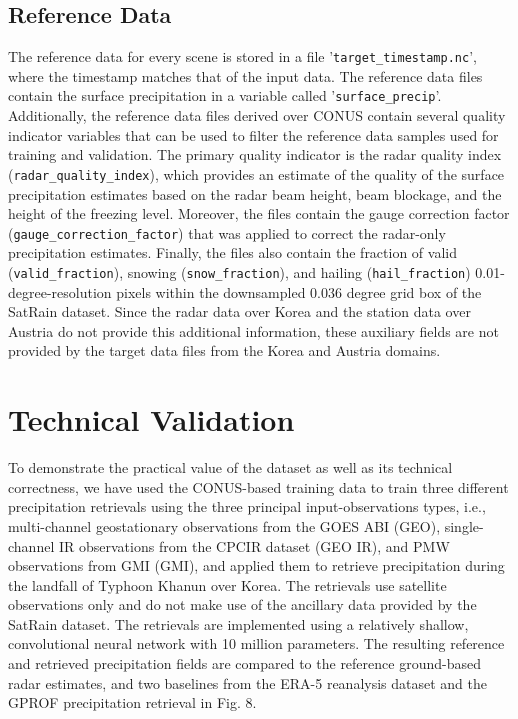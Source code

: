 \documentclass[11pt]{article}
\begin{document}
\subsection{Reference Data}

The reference data for every scene is stored in a file
'\texttt{target\_\textlangle timestamp\textrangle.nc}', where the timestamp
matches that of the input data. The reference data files contain the surface
precipitation in a variable called '\texttt{surface\_precip}'. Additionally, the
reference data files derived over CONUS contain several quality indicator
variables that can be used to filter the reference data samples used for
training and validation. The primary quality indicator is the radar quality
index (\texttt{radar\_quality\_index}), which provides an estimate of the
quality of the surface precipitation estimates based on the radar beam height,
beam blockage, and the height of the freezing level. Moreover, the files contain
the gauge correction factor (\texttt{gauge\_correction\_factor}) that was
applied to correct the radar-only precipitation estimates. Finally, the files
also contain the fraction of valid (\texttt{valid\_fraction}), snowing
(\texttt{snow\_fraction}), and hailing (\texttt{hail\_fraction})
0.01-degree-resolution pixels within the downsampled 0.036 degree grid box of
the SatRain dataset. Since the radar data over Korea and the station data over
Austria do not provide this additional information, these auxiliary fields are
not provided by the target data files from the Korea and Austria domains.


\section{Technical Validation}

To demonstrate the practical value of the dataset as well as its technical
correctness, we have used the CONUS-based training data to train three different
precipitation retrievals using the three principal input-observations types,
i.e., multi-channel geostationary observations from the GOES ABI (GEO),
single-channel IR observations from the CPCIR dataset (GEO IR), and PMW
observations from GMI (GMI), and applied them to retrieve precipitation during
the landfall of Typhoon Khanun over Korea. The retrievals use satellite
observations only and do not make use of the ancillary data provided by the
SatRain dataset. The retrievals are implemented using a relatively shallow,
convolutional neural network with 10 million parameters. The resulting reference
and retrieved precipitation fields are compared to the reference ground-based
radar estimates, and two baselines from the ERA-5 reanalysis dataset and the
GPROF precipitation retrieval in Fig. 8.
\end{document}

